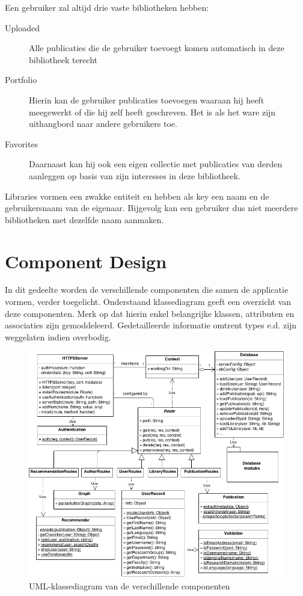 \documentclass{article}
\begin{document}
Een gebruiker zal altijd drie vaste bibliotheken hebben:

\begin{description}

\item[Uploaded] Alle publicaties die de gebruiker toevoegt komen automatisch in deze bibliotheek terecht

\item[Portfolio] Hierin kan de gebruiker publicaties toevoegen waaraan hij heeft meegewerkt of die hij zelf heeft geschreven. Het is als het ware zijn uithangbord naar andere gebruikers toe.

\item[Favorites] Daarnaast kan hij ook een eigen collectie met publicaties van derden aanleggen op basis van zijn interesses in deze bibliotheek.

\end{description}

Libraries vormen een zwakke entiteit en hebben als key een naam en de gebruikersnaam van de eigenaar. Bijgevolg kan een gebruiker dus niet meerdere bibliotheken met dezelfde naam aanmaken. \\

\clearpage

\section{Component Design}
\label{sec:components}

In dit gedeelte worden de verschillende componenten die samen de applicatie vormen, verder toegelicht. Onderstaand klassediagram geeft een overzicht van deze componenten. Merk op dat hierin enkel belangrijke klassen, attributen en associaties zijn gemoddeleerd. Gedetailleerde informatie omtrent types e.d. zijn weggelaten indien overbodig. 

\begin{figure}[!h]
\centering
 \includegraphics[width=160mm]{Klassediagram.png}
 \caption{UML-klassediagram van de verschillende componenten }
 \label{class-diagram}
\end{figure}
\end{document}
